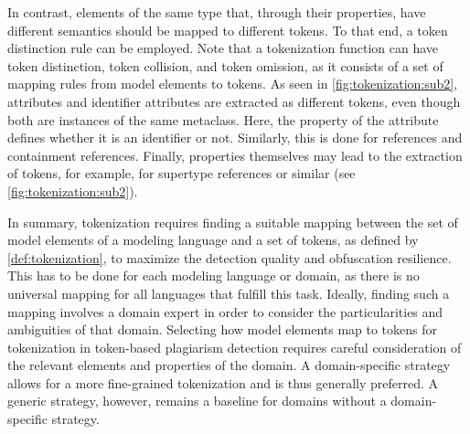 In contrast, elements of the same type that, through their properties, have different semantics should be mapped to different tokens.
To that end, a token distinction rule can be employed.
Note that a tokenization function can have token distinction, token collision, and token omission, as it consists of a set of mapping rules from model elements to tokens.
As seen in \autoref{fig:tokenization:sub2}, attributes and identifier attributes are extracted as different tokens, even though both are instances of the same metaclass. Here, the property of the attribute defines whether it is an identifier or not.
Similarly, this is done for references and containment references.
Finally, properties themselves may lead to the extraction of tokens, for example, for supertype references or similar (see \autoref{fig:tokenization:sub2}).

In summary, tokenization requires finding a suitable mapping between the set of model elements of a modeling language and a set of tokens, as defined by \autoref{def:tokenization}, to maximize the detection quality and obfuscation resilience. This has to be done for each modeling language or domain, as there is no universal mapping for all languages that fulfill this task. Ideally, finding such a mapping involves a domain expert in order to consider the particularities and ambiguities of that domain.
%
Selecting how model elements map to tokens for tokenization in token-based plagiarism detection requires careful consideration of the relevant elements and properties of the domain. A domain-specific strategy allows for a more fine-grained tokenization and is thus generally preferred. A generic strategy, however, remains a baseline for domains without a domain-specific strategy.

